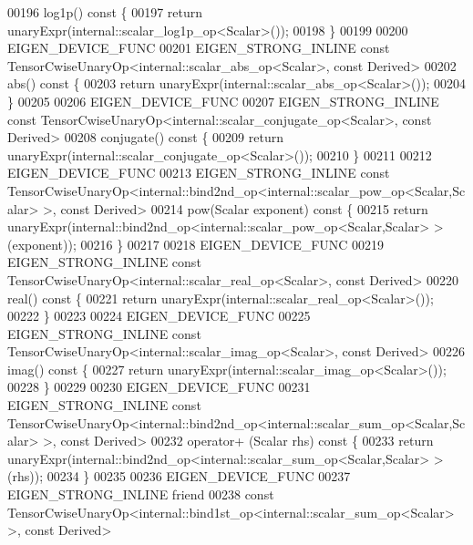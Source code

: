 \begin{DoxyCode}
00196     log1p()\textcolor{keyword}{ const }\{
00197       \textcolor{keywordflow}{return} unaryExpr(internal::scalar\_log1p\_op<Scalar>());
00198     \}
00199 
00200     EIGEN\_DEVICE\_FUNC
00201     EIGEN\_STRONG\_INLINE \textcolor{keyword}{const} TensorCwiseUnaryOp<internal::scalar\_abs\_op<Scalar>, \textcolor{keyword}{const} Derived>
00202     abs()\textcolor{keyword}{ const }\{
00203       \textcolor{keywordflow}{return} unaryExpr(internal::scalar\_abs\_op<Scalar>());
00204     \}
00205 
00206     EIGEN\_DEVICE\_FUNC
00207     EIGEN\_STRONG\_INLINE \textcolor{keyword}{const} TensorCwiseUnaryOp<internal::scalar\_conjugate\_op<Scalar>, \textcolor{keyword}{const} Derived>
00208     conjugate()\textcolor{keyword}{ const }\{
00209       \textcolor{keywordflow}{return} unaryExpr(internal::scalar\_conjugate\_op<Scalar>());
00210     \}
00211 
00212     EIGEN\_DEVICE\_FUNC
00213     EIGEN\_STRONG\_INLINE \textcolor{keyword}{const} 
      TensorCwiseUnaryOp<internal::bind2nd\_op<internal::scalar\_pow\_op<Scalar,Scalar> >, \textcolor{keyword}{const} Derived>
00214     pow(Scalar exponent)\textcolor{keyword}{ const }\{
00215       \textcolor{keywordflow}{return} unaryExpr(internal::bind2nd\_op<internal::scalar\_pow\_op<Scalar,Scalar> >(exponent));
00216     \}
00217 
00218     EIGEN\_DEVICE\_FUNC
00219     EIGEN\_STRONG\_INLINE \textcolor{keyword}{const} TensorCwiseUnaryOp<internal::scalar\_real\_op<Scalar>, \textcolor{keyword}{const} Derived>
00220     real()\textcolor{keyword}{ const }\{
00221       \textcolor{keywordflow}{return} unaryExpr(internal::scalar\_real\_op<Scalar>());
00222     \}
00223 
00224     EIGEN\_DEVICE\_FUNC
00225     EIGEN\_STRONG\_INLINE \textcolor{keyword}{const} TensorCwiseUnaryOp<internal::scalar\_imag\_op<Scalar>, \textcolor{keyword}{const} Derived>
00226     imag()\textcolor{keyword}{ const }\{
00227       \textcolor{keywordflow}{return} unaryExpr(internal::scalar\_imag\_op<Scalar>());
00228     \}
00229 
00230     EIGEN\_DEVICE\_FUNC
00231     EIGEN\_STRONG\_INLINE \textcolor{keyword}{const} 
      TensorCwiseUnaryOp<internal::bind2nd\_op<internal::scalar\_sum\_op<Scalar,Scalar> >, \textcolor{keyword}{const} Derived>
00232     operator+ (Scalar rhs)\textcolor{keyword}{ const }\{
00233       \textcolor{keywordflow}{return} unaryExpr(internal::bind2nd\_op<internal::scalar\_sum\_op<Scalar,Scalar> >(rhs));
00234     \}
00235 
00236     EIGEN\_DEVICE\_FUNC
00237     EIGEN\_STRONG\_INLINE \textcolor{keyword}{friend}
00238     \textcolor{keyword}{const} TensorCwiseUnaryOp<internal::bind1st\_op<internal::scalar\_sum\_op<Scalar> >, \textcolor{keyword}{const} Derived>

\end{DoxyCode}
